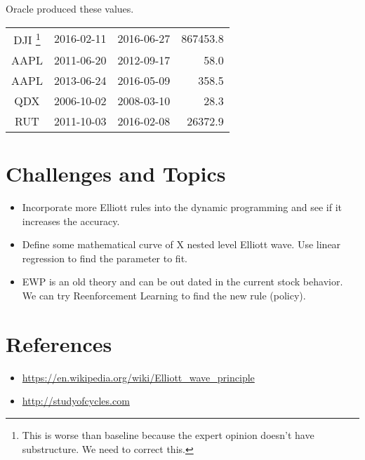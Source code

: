 \documentclass[12pt]{article}
\begin{document}
Oracle produced these values.

\begin{tabular}{cccr}
DJI \footnote{This is worse than baseline because the expert opinion doesn't have substructure. We need to correct this.} & 2016-02-11 & 2016-06-27 & 867453.8  \\
AAPL & 2011-06-20 & 2012-09-17 & 58.0 \\ 
AAPL & 2013-06-24 & 2016-05-09 & 358.5 \\
QDX  & 2006-10-02 & 2008-03-10 & 28.3 \\
RUT  & 2011-10-03 & 2016-02-08 & 26372.9 \\
\end{tabular}

\section{Challenges and Topics}

\begin{itemize}
\item Incorporate more Elliott rules into the dynamic programming and
  see if it increases the accuracy.
\item Define some mathematical curve of X nested level Elliott
  wave. Use linear regression to find the parameter to fit.
\item EWP is an old theory and can be out dated in the current stock
  behavior. We can try Reenforcement Learning to find the new rule
  (policy).
\end{itemize}

\section*{References}

\begin{itemize}
\item \url{https://en.wikipedia.org/wiki/Elliott_wave_principle}
\item \url{http://studyofcycles.com}
\end{itemize}
     
\end{document}
